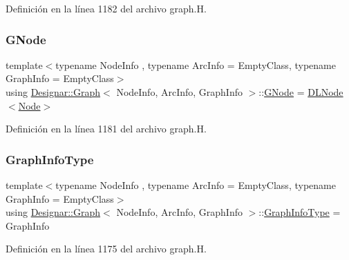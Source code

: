 Definición en la línea 1182 del archivo graph.\+H.

\mbox{\label{class_designar_1_1_graph_a7e61951db0bb9bfa8a2e317440d4e17f}} 
\subsubsection{\texorpdfstring{G\+Node}{GNode}}
{\footnotesize\ttfamily template$<$typename Node\+Info , typename Arc\+Info  = Empty\+Class, typename Graph\+Info  = Empty\+Class$>$ \\
using \hyperlink{class_designar_1_1_graph}{Designar\+::\+Graph}$<$ Node\+Info, Arc\+Info, Graph\+Info $>$\+::\hyperlink{class_designar_1_1_graph_a7e61951db0bb9bfa8a2e317440d4e17f}{G\+Node} =  \hyperlink{class_designar_1_1_d_l_node}{D\+L\+Node}$<$\hyperlink{class_designar_1_1_graph_a5dfc7dba9d092ac489c72e40390c37d0}{Node}$>$\hspace{0.3cm}{\ttfamily [protected]}}



Definición en la línea 1181 del archivo graph.\+H.

\mbox{\label{class_designar_1_1_graph_a5b6ad505f3b0f5a5cd288a13bebf2d27}} 
\subsubsection{\texorpdfstring{Graph\+Info\+Type}{GraphInfoType}}
{\footnotesize\ttfamily template$<$typename Node\+Info , typename Arc\+Info  = Empty\+Class, typename Graph\+Info  = Empty\+Class$>$ \\
using \hyperlink{class_designar_1_1_graph}{Designar\+::\+Graph}$<$ Node\+Info, Arc\+Info, Graph\+Info $>$\+::\hyperlink{class_designar_1_1_graph_a5b6ad505f3b0f5a5cd288a13bebf2d27}{Graph\+Info\+Type} =  Graph\+Info}



Definición en la línea 1175 del archivo graph.\+H.

\mbox{\label{class_designar_1_1_graph_a5dfc7dba9d092ac489c72e40390c37d0}} 
